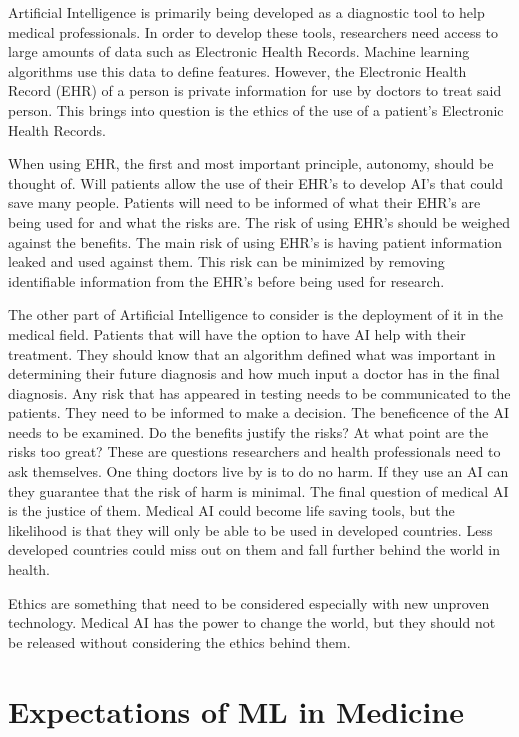 \documentclass[]{article}
\begin{document}
		Artificial Intelligence is primarily being developed as a diagnostic tool to help medical professionals. In order to develop these tools, researchers need access to large amounts of data such as Electronic Health Records. Machine learning algorithms use this data to define features. However, the Electronic Health Record (EHR) of a person is private information for use by doctors to treat said person. This brings into question is the ethics of the use of a patient’s Electronic Health Records.

		When using EHR, the first and most important principle, autonomy, should be thought of. Will patients allow the use of their EHR’s to develop AI’s that could save many people. Patients will need to be informed of what their EHR’s are being used for and what the risks are. The risk of using EHR’s should be weighed against the benefits. The main risk of using EHR’s is having patient information leaked and used against them. This risk can be minimized by removing identifiable information from the EHR’s before being used for research.

		The other part of Artificial Intelligence to consider is the deployment of it in the medical field. Patients that will have the option to have AI help with their treatment. They should know that an algorithm defined what was important in determining their future diagnosis and how much input a doctor has in the final diagnosis. Any risk that has appeared in testing needs to be communicated to the patients. They need to be informed to make a decision. The beneficence of the AI needs to be examined. Do the benefits justify the risks? At what point are the risks too great? These are questions researchers and health professionals need to ask themselves. One thing doctors live by is to do no harm. If they use an AI can they guarantee that the risk of harm is minimal. The final question of medical AI is the justice of them. Medical AI could become life saving tools, but the likelihood is that they will only be able to be used in developed countries. Less developed countries could miss out on them and fall further behind the world in health.

		Ethics are something that need to be considered especially with new unproven technology. Medical AI has the power to change the world, but they should not be released without considering the ethics behind them.

	\section{Expectations of ML in Medicine}
\end{document}
